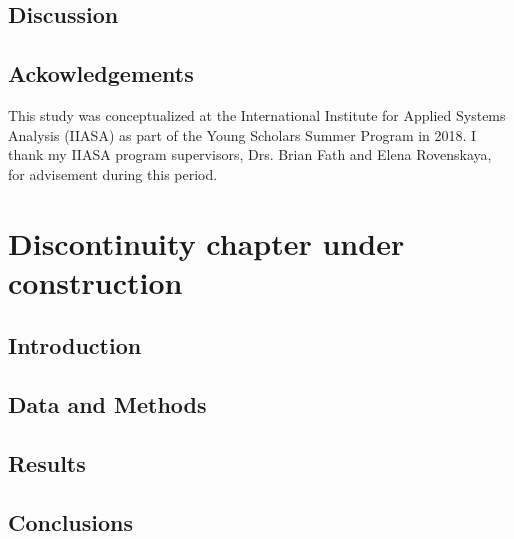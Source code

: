 \documentclass[12pt,twoside,openany]{reedthesis}
\begin{document}
\hypertarget{discussion-3}{%
\section{Discussion}\label{discussion-3}}

\hypertarget{ackowledgements}{%
\section{Ackowledgements}\label{ackowledgements}}

This study was conceptualized at the International Institute for Applied Systems Analysis (IIASA) as part of the Young Scholars Summer Program in 2018. I thank my IIASA program supervisors, Drs. Brian Fath and Elena Rovenskaya, for advisement during this period.

\hypertarget{discontinuity}{%
\chapter{Discontinuity chapter under construction}\label{discontinuity}}

\hypertarget{introduction-5}{%
\section{Introduction}\label{introduction-5}}

\hypertarget{data-and-methods-2}{%
\section{Data and Methods}\label{data-and-methods-2}}

\hypertarget{results-3}{%
\section{Results}\label{results-3}}

\hypertarget{conclusions}{%
\section{Conclusions}\label{conclusions}}
\end{document}
